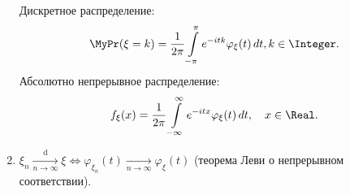 \begin{namedthm}
\begin{enumerate}
            Дискретное распределение:
            \begin{equation*}
                \MyPr(\xi=k)=\frac{1}{2 \pi} \int\limits_{-\pi}^{\pi} e^{-i t k} \varphi_{\xi}(t) \, d t, k \in \Integer.
            \end{equation*}
            Абсолютно непрерывное распределение:
            \begin{equation*}
                f_{\xi}(x)=\frac{1}{2 \pi} \int\limits_{-\infty}^{\infty} e^{-i t x} \varphi_{\xi}(t) \, d t, \quad x \in \Real.
            \end{equation*}
        \item 
            $\xi_n \xrightarrow[n \to \infty]{\text{d}} \xi \iff \varphi_{\xi_{n}}(t) \xrightarrow[n \to \infty]{} \varphi_{\xi}(t)$ (теорема Леви о непрерывном соответствии).
    \end{enumerate}
\end{namedthm}

